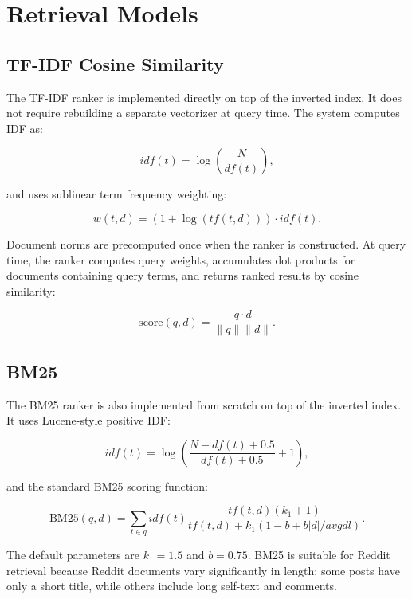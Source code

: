 \documentclass[11pt]{article}
\begin{document}
\section{Retrieval Models}
\subsection{TF-IDF Cosine Similarity}
The TF-IDF ranker is implemented directly on top of the inverted index. It does not require rebuilding a separate vectorizer at query time. The system computes IDF as:

\begin{equation}
    idf(t) = \log\left(\frac{N}{df(t)}\right),
\end{equation}

and uses sublinear term frequency weighting:

\begin{equation}
    w(t,d) = (1 + \log(tf(t,d))) \cdot idf(t).
\end{equation}

Document norms are precomputed once when the ranker is constructed. At query time, the ranker computes query weights, accumulates dot products for documents containing query terms, and returns ranked results by cosine similarity:

\begin{equation}
    \text{score}(q,d) = \frac{q \cdot d}{\|q\|\|d\|}.
\end{equation}

\subsection{BM25}
The BM25 ranker is also implemented from scratch on top of the inverted index. It uses Lucene-style positive IDF:

\begin{equation}
    idf(t) = \log\left(\frac{N - df(t) + 0.5}{df(t) + 0.5} + 1\right),
\end{equation}

and the standard BM25 scoring function:

\begin{equation}
    \text{BM25}(q,d) = \sum_{t \in q} idf(t)
    \frac{tf(t,d)(k_1+1)}{tf(t,d)+k_1(1-b+b|d|/avgdl)}.
\end{equation}

The default parameters are $k_1=1.5$ and $b=0.75$. BM25 is suitable for Reddit retrieval because Reddit documents vary significantly in length; some posts have only a short title, while others include long self-text and comments.
\end{document}
